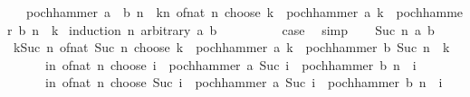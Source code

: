 \begin{isabellebody}
\ \ \ {\isachardoublequoteopen}pochhammer\ {\isacharparenleft}{\kern0pt}a\ {\isacharplus}{\kern0pt}\ b{\isacharparenright}{\kern0pt}\ n\ {\isacharequal}{\kern0pt}\ {\isacharparenleft}{\kern0pt}{\isasymSum}k{\isasymle}n{\isachardot}{\kern0pt}\ of{\isacharunderscore}{\kern0pt}nat\ {\isacharparenleft}{\kern0pt}n\ choose\ k{\isacharparenright}{\kern0pt}\ {\isacharasterisk}{\kern0pt}\ pochhammer\ a\ k\ {\isacharasterisk}{\kern0pt}\ pochhammer\ b\ {\isacharparenleft}{\kern0pt}n\ {\isacharminus}{\kern0pt}\ k{\isacharparenright}{\kern0pt}{\isacharparenright}{\kern0pt}{\isachardoublequoteclose}\isanewline
%
\isadelimproof
%
\endisadelimproof
%
\isatagproof
{}\isamarkupfalse%
\ {\isacharparenleft}{\kern0pt}induction\ n\ arbitrary{\isacharcolon}{\kern0pt}\ a\ b{\isacharparenright}{\kern0pt}\isanewline
\ \ \isamarkupfalse%
\ {}\isanewline
\ \ \isamarkupfalse%
\ \isamarkupfalse%
\ {\isacharquery}{\kern0pt}case\ \isamarkupfalse%
\ simp\isanewline
{}\isamarkupfalse%
\isanewline
\ \ \isamarkupfalse%
\ {\isacharparenleft}{\kern0pt}Suc\ n\ a\ b{\isacharparenright}{\kern0pt}\isanewline
\ \ \isamarkupfalse%
\ {\isachardoublequoteopen}{\isacharparenleft}{\kern0pt}{\isasymSum}k{\isasymle}Suc\ n{\isachardot}{\kern0pt}\ of{\isacharunderscore}{\kern0pt}nat\ {\isacharparenleft}{\kern0pt}Suc\ n\ choose\ k{\isacharparenright}{\kern0pt}\ {\isacharasterisk}{\kern0pt}\ pochhammer\ a\ k\ {\isacharasterisk}{\kern0pt}\ pochhammer\ b\ {\isacharparenleft}{\kern0pt}Suc\ n\ {\isacharminus}{\kern0pt}\ k{\isacharparenright}{\kern0pt}{\isacharparenright}{\kern0pt}\ {\isacharequal}{\kern0pt}\isanewline
\ \ \ \ \ \ {\isacharparenleft}{\kern0pt}{\isasymSum}i{\isasymle}n{\isachardot}{\kern0pt}\ of{\isacharunderscore}{\kern0pt}nat\ {\isacharparenleft}{\kern0pt}n\ choose\ i{\isacharparenright}{\kern0pt}\ {\isacharasterisk}{\kern0pt}\ pochhammer\ a\ {\isacharparenleft}{\kern0pt}Suc\ i{\isacharparenright}{\kern0pt}\ {\isacharasterisk}{\kern0pt}\ pochhammer\ b\ {\isacharparenleft}{\kern0pt}n\ {\isacharminus}{\kern0pt}\ i{\isacharparenright}{\kern0pt}{\isacharparenright}{\kern0pt}\ {\isacharplus}{\kern0pt}\isanewline
\ \ \ \ \ \ {\isacharparenleft}{\kern0pt}{\isacharparenleft}{\kern0pt}{\isasymSum}i{\isasymle}n{\isachardot}{\kern0pt}\ of{\isacharunderscore}{\kern0pt}nat\ {\isacharparenleft}{\kern0pt}n\ choose\ Suc\ i{\isacharparenright}{\kern0pt}\ {\isacharasterisk}{\kern0pt}\ pochhammer\ a\ {\isacharparenleft}{\kern0pt}Suc\ i{\isacharparenright}{\kern0pt}\ {\isacharasterisk}{\kern0pt}\ pochhammer\ b\ {\isacharparenleft}{\kern0pt}n\ {\isacharminus}{\kern0pt}\ i{\isacharparenright}{\kern0pt}{\isacharparenright}{\kern0pt}\ {\isacharplus}{\kern0pt}\isanewline

\end{isabellebody}
